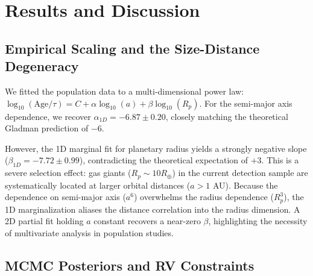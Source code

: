 \documentclass[a4paper,11pt]{article}
\numberwithin{equation}{section}
\begin{document}
\section{Results and Discussion}
\label{sec:results}

\subsection{Empirical Scaling and the Size-Distance Degeneracy}


We fitted the population data to a multi-dimensional power law: $\log_{10}(\text{Age}/\tau) = C + \alpha \log_{10}(a) + \beta \log_{10}(R_p)$. For the semi-major axis dependence, we recover $\alpha_{1D} = -6.87 \pm 0.20$, closely matching the theoretical Gladman prediction of $-6$. 

However, the 1D marginal fit for planetary radius yields a strongly negative slope ($\beta_{1D} = -7.72 \pm 0.99$), contradicting the theoretical expectation of $+3$. This is a severe selection effect: gas giants ($R_p \sim 10 R_\oplus$) in the current detection sample are systematically located at larger orbital distances ($a > 1$ AU). Because the dependence on semi-major axis ($a^6$) overwhelms the radius dependence ($R_p^3$), the 1D marginalization aliases the distance correlation into the radius dimension. A 2D partial fit holding $a$ constant recovers a near-zero $\beta$, highlighting the necessity of multivariate analysis in population studies.

\subsection{MCMC Posteriors and RV Constraints}

\end{document}
